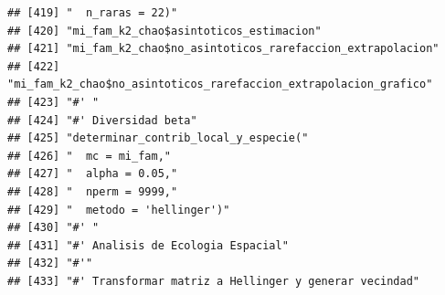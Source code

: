 \documentclass[11pt,]{article}
\begin{document}
\begin{verbatim}
## [419] "  n_raras = 22)"                                                                                                                                                       
## [420] "mi_fam_k2_chao$asintoticos_estimacion"                                                                                                                                 
## [421] "mi_fam_k2_chao$no_asintoticos_rarefaccion_extrapolacion"                                                                                                               
## [422] "mi_fam_k2_chao$no_asintoticos_rarefaccion_extrapolacion_grafico"                                                                                                       
## [423] "#' "                                                                                                                                                                   
## [424] "#' Diversidad beta"                                                                                                                                                    
## [425] "determinar_contrib_local_y_especie("                                                                                                                                   
## [426] "  mc = mi_fam,"                                                                                                                                                        
## [427] "  alpha = 0.05,"                                                                                                                                                       
## [428] "  nperm = 9999,"                                                                                                                                                       
## [429] "  metodo = 'hellinger')"                                                                                                                                               
## [430] "#' "                                                                                                                                                                   
## [431] "#' Analisis de Ecologia Espacial"                                                                                                                                      
## [432] "#'"                                                                                                                                                                    
## [433] "#' Transformar matriz a Hellinger y generar vecindad"                                                                                                                  

\end{verbatim}
\end{document}
